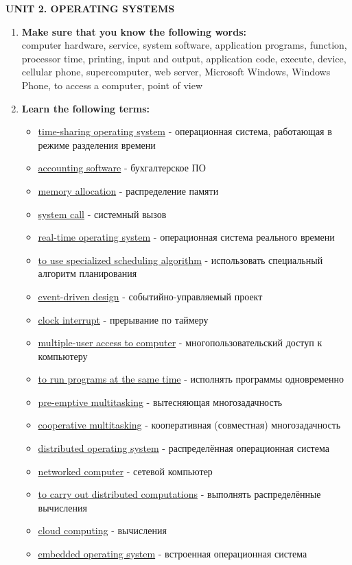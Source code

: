 \documentclass{full}
\begin{document}
\setcounter{task}{1}
\newcommand\gettask{\arabic{task}}
\newcommand\nexttask{\setcounter{task}{\gettask+1}}
\noindent
\textbf{UNIT 2. OPERATING SYSTEMS}
\begin{enumerate}[label=\textbf{\Roman*.},leftmargin=5ex,start=\gettask]
  \item \textbf{Make sure that you know the following words:} \\
    computer hardware, service, system software, application programs,
    function, processor time, printing, input and output, application code,
    execute, device, cellular phone, supercomputer, web server, Microsoft
    Windows, Windows Phone, to access a computer, point of view

  \nexttask
  \item \textbf{Learn the following terms:}
    \begin{itemize}[itemsep=1ex,label=\textbullet\;]
      \item \uline{time-sharing operating system} - операционная система,
        работающая в режиме разделения времени
      \item \uline{accounting software} - бухгалтерское ПО
      \item \uline{memory allocation} - распределение памяти
      \item \uline{system call} - системный вызов
      \item \uline{real-time operating system} - операционная система реального
        времени
      \item \uline{to use specialized scheduling algorithm} - использовать
        специальный алгоритм планирования
      \item \uline{event-driven design} - событийно-управляемый проект
      \item \uline{clock interrupt} - прерывание по таймеру
      \item \uline{multiple-user access to computer} - многопользовательский
        доступ к компьютеру
      \item \uline{to run programs at the same time} - исполнять программы
        одновременно
      \item \uline{pre-emptive multitasking} - вытесняющая многозадачность
      \item \uline{cooperative multitasking} - кооперативная (совместная)
        многозадачность
      \item \uline{distributed operating system} - распределённая операционная
        система
      \item \uline{networked computer} - сетевой компьютер
      \item \uline{to carry out distributed computations} - выполнять
        распределённые вычисления
      \item \uline{cloud computing} -  вычисления
      \item \uline{embedded operating system} - встроенная операционная система
    \end{itemize}


\end{enumerate}
\end{document}

